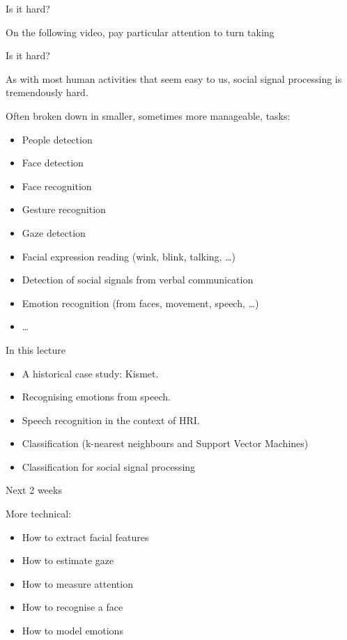 \documentclass[compress]{beamer}
\begin{document}
\begin{frame}{Is it hard?}

    On the following video, pay particular attention to turn taking
\end{frame}


\begin{frame}{Is it hard?}

As with most human activities that seem easy to us, social signal
processing is tremendously hard.

Often broken down in smaller, sometimes more manageable, tasks:

\begin{itemize}

\item People detection
\item Face detection
\item Face recognition
\item Gesture recognition
\item Gaze detection
\item Facial expression reading (wink, blink, talking, \ldots{})
\item Detection of social signals from verbal communication
\item Emotion recognition (from faces, movement, speech, \ldots{})
\item \ldots{}
\end{itemize}

\end{frame}

\begin{frame}{In this lecture}

\begin{itemize}

\item
  A historical case study: Kismet.
\item
  Recognising emotions from speech.
\item
  Speech recognition in the context of HRI.
\item
  Classification (k-nearest neighbours and Support Vector Machines)
\item
  Classification for social signal processing
\end{itemize}

\end{frame}


\begin{frame}{Next 2 weeks}

    More technical:

    \begin{itemize}
        \item How to extract facial features
        \item How to estimate gaze
        \item How to measure attention
        \item How to recognise a face
        \item How to model emotions
    \end{itemize}

\end{frame}
\end{document}
